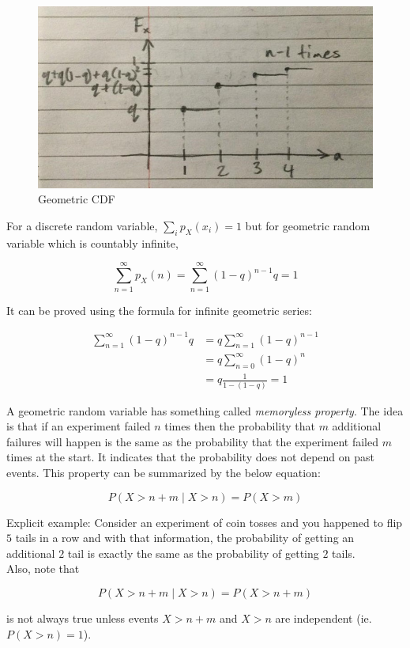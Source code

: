 \begin{figure}[H]
	\centering
	\includegraphics[width=120mm]{8.jpg}
	\caption{Geometric CDF}
\end{figure}

For a discrete random variable, $\sum_i p_X (x_i)=1$ but for geometric random variable which is countably infinite,

$$\sum_{n=1}^\infty p_X(n) = \sum_{n=1}^\infty (1-q)^{n-1} q = 1$$

It can be proved using the formula for infinite geometric series:

\begin{align*}
	\sum_{n=1}^\infty (1-q)^{n-1} q &= q \sum_{n=1}^\infty (1-q)^{n-1} \\
	&= q \sum_{n=0}^\infty (1-q)^{n} \\
	&= q\frac{1}{1-(1-q)} = 1
\end{align*}

A geometric random variable has something called \textit{memoryless property}. The idea is that if an experiment failed $n$ times then the probability that $m$ additional failures will happen is the same as the probability that the experiment failed $m$ times at the start. It indicates that the probability does not depend on past events. This property can be summarized by the below equation:

$$P(X>n+m\mid X>n)=P(X>m)$$

Explicit example: Consider an experiment of coin tosses and you happened to flip $5$ tails in a row and with that information, the probability of getting an additional $2$ tail is exactly the same as the probability of getting $2$ tails. \\

Also, note that

$$P(X>n+m\mid X>n)=P(X>n+m)$$

is not always true unless events $X>n+m$ and $X>n$ are independent (ie. $P(X>n)=1$). \\

